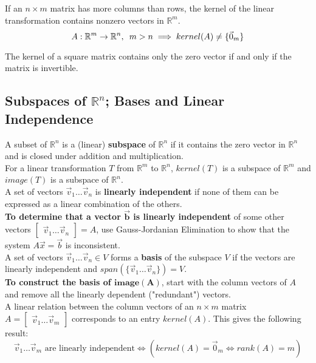 \documentclass[]{scrartcl}
\begin{document}
	If an $n \times m$ matrix has more columns than rows, the kernel of the linear transformation contains nonzero vectors in $\mathbb{R}^m$.
	$$
	A: \mathbb{R}^m \rightarrow \mathbb{R}^n, \enskip m > n \implies kernel(A) \neq \{\vec{0}_m\}
	$$
	
	The kernel of a square matrix contains only the zero vector if and only if the matrix is invertible.
	
	\subsection{Subspaces of $\mathbb{R}^n$; Bases and Linear Independence}
	A subset of $\mathbb{R}^n$ is a (linear) \textbf{subspace} of $\mathbb{R}^n$ if it contains the zero vector in $\mathbb{R}^n$ and is closed under addition and multiplication.\\
	
	For a linear transformation $T$ from $\mathbb{R}^m$ to $\mathbb{R}^n$, $kernel(T)$ is a subspace of $\mathbb{R}^m$ and $image(T)$ is a subspace of $\mathbb{R}^n$.\\
	
	A set of vectors $\vec{v}_1 \ldots \vec{v}_n$ is \textbf{linearly independent} if none of them can be expressed as a linear combination of the others.\\
	
	\textbf{To determine that a vector $\boldsymbol{\vec{b}}$ is linearly independent} of some other vectors $\begin{bmatrix}\vec{v}_1 \ldots \vec{v}_n\end{bmatrix} = A$, use Gauss-Jordanian Elimination to show that the system $A\vec{x}=\vec{b}$ is inconsistent.\\
	
	A set of vectors $\vec{v}_1 \ldots \vec{v}_n \in V$ forms a \textbf{basis} of the subspace $V$ if the vectors are linearly independent and $span(\{\vec{v}_1 \ldots \vec{v}_n\}) = V$.\\
	
	\textbf{To construct the basis of $\boldsymbol{image(A)}$}, start with the column vectors of $A$ and remove all the linearly dependent ("redundant") vectors.\\
	
	A linear relation between the column vectors of an $n \times m$ matrix $A=\begin{bmatrix}\vec{v}_1 \ldots \vec{v}_m\end{bmatrix}$ corresponds to an entry $kernel(A)$. This gives the following result:
	$$
	\vec{v}_1 \ldots \vec{v}_m \text{ are linearly independent} \iff (kernel(A)=\vec{0}_m \iff rank(A)=m)
	$$
	
\end{document}
